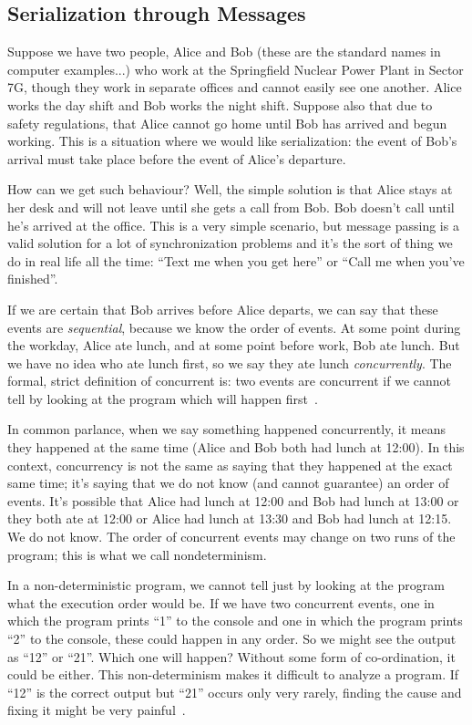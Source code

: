 \subsection*{Serialization through Messages}

Suppose we have two people, Alice and Bob (these are the standard names in computer examples...) who work at the Springfield Nuclear Power Plant in Sector 7G, though they work in separate offices and cannot easily see one another. Alice works the day shift and Bob works the night shift. Suppose also that due to safety regulations, that Alice cannot go home until Bob has arrived and begun working. This is a situation where we would like serialization: the event of Bob's arrival must take place before the event of Alice's departure. 

How can we get such behaviour? Well, the simple solution is that Alice stays at her desk and will not leave until she gets a call from Bob. Bob doesn't call until he's arrived at the office. This is a very simple scenario, but message passing is a valid solution for a lot of synchronization problems and it's the sort of thing we do in real life all the time: ``Text me when you get here'' or ``Call me when you've finished''. 

If we are certain that Bob arrives before Alice departs, we can say that these events are \textit{sequential}, because we know the order of events. At some point during the workday, Alice ate lunch, and at some point before work, Bob ate lunch. But we have no idea who ate lunch first, so we say they ate lunch \textit{concurrently}. The formal, strict definition of concurrent is: two events are concurrent if we cannot tell by looking at the program which will happen first~\cite{lbs}. 

In common parlance, when we say something happened concurrently, it means they happened at the same time (Alice and Bob both had lunch at 12:00). In this context, concurrency is not the same as saying that they happened at the exact same time; it's saying that we do not know (and cannot guarantee) an order of events. It's possible that Alice had lunch at 12:00 and Bob had lunch at 13:00 or they both ate at 12:00 or Alice had lunch at 13:30 and Bob had lunch at 12:15. We do not know. The order of concurrent events may change on two runs of the program; this is what we call nondeterminism.

In a non-deterministic program, we cannot tell just by looking at the program what the execution order would be. If we have two concurrent events, one in which the program prints ``1'' to the console and one in which the program prints ``2'' to the console, these could happen in any order. So we might see the output as ``12'' or ``21''. Which one will happen? Without some form of co-ordination, it could be either. This non-determinism makes it difficult to analyze a program. If ``12'' is the correct output but ``21'' occurs only very rarely, finding the cause and fixing it might be very painful~\cite{lbs}. 

